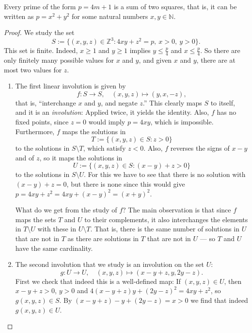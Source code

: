 \begin{proposition}
  \label{ch4.proposition2}
  Every prime of the form \(p = 4m + 1\) is a sum of two squares,
  that is, it can be written as \(p = x^2 + y^2\) for some natural numbers \(x,y \in \mathbb{N}\).
\end{proposition}
\begin{proof}
  \leanok
 We study the set
\[
S := \{(x, y, z) \in \mathbb{Z}^3 : 4xy + z^2 = p, \ x > 0, \ y > 0\}.
\]
This set is finite. Indeed, $x \geq 1$ and $y \geq 1$ implies $y \leq \frac{p}{4}$ and
$x \leq \frac{p}{4}$. So there are only finitely many possible values for $x$ and $y$, and given
$x$ and $y$, there are at most two values for $z$.

\begin{enumerate}
    \item The first linear involution is given by
    \[
    f : S \to S, \quad (x, y, z) \mapsto (y, x, -z),
    \]
    that is, ``interchange $x$ and $y$, and negate $z$.'' This clearly maps $S$ to itself, and it is
    an \emph{involution}: Applied twice, it yields the identity. Also, $f$ has no fixed points,
    since $z = 0$ would imply $p = 4xy$, which is impossible. Furthermore, $f$ maps the solutions in
    \[
    T := \{(x, y, z) \in S : z > 0\}
    \]
    to the solutions in $S \setminus T$, which satisfy $z < 0$. Also, $f$ reverses the signs of
    $x - y$ and of $z$, so it maps the solutions in
    \[
    U := \{(x, y, z) \in S : (x - y) + z > 0\}
    \]
    to the solutions in $S \setminus U$. For this we have to see that there is no solution with
    $(x - y) + z = 0$, but there is none since this would give
    $p = 4xy + z^2 = 4xy + (x - y)^2 = (x + y)^2$.

    What do we get from the study of $f$? The main observation is that since $f$ maps the sets $T$
    and $U$ to their complements, it also interchanges the elements in $T \setminus U$ with these in
    $U \setminus T$. That is, there is the same number of solutions in $U$ that are not in $T$ as
    there are solutions in $T$ that are not in $U$ — so $T$ and $U$ have the same cardinality.

    \item The second involution that we study is an involution on the set $U$:
    \[
    g : U \to U, \quad (x, y, z) \mapsto (x - y + z, y, 2y - z).
    \]
    First we check that indeed this is a well-defined map: If $(x, y, z) \in U$, then
    $x - y + z > 0$, $y > 0$ and $4(x - y + z)y + (2y - z)^2 = 4xy + z^2$, so $g(x, y, z) \in S$.
    By $(x - y + z) - y + (2y - z) = x > 0$ we find that indeed $g(x, y, z) \in U$.


\end{enumerate}
\end{proof}
